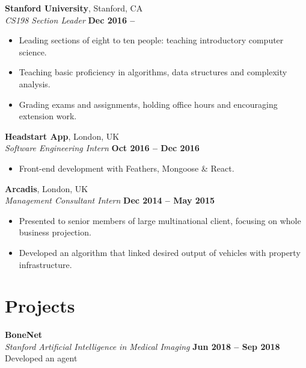 \documentclass[margin,line]{resume}
\begin{document}
\begin{resume}
    \textbf{Stanford University}, Stanford, CA \vspace{2mm}\\\vspace{1mm}%
    \textsl{CS198 Section Leader} \hfill \textbf{Dec 2016 --}
    \begin{itemize}
 	\item Leading sections of eight to ten people: teaching introductory computer science.
    \item Teaching basic proficiency in algorithms, data structures and complexity analysis.
	\item Grading exams and assignments, holding office hours and encouraging extension work.
    \end{itemize}

    \textbf{Headstart App}, London, UK \vspace{2mm}\\\vspace{1mm}%
    \textsl{Software Engineering Intern} \hfill \textbf{Oct 2016 -- Dec 2016}
    \begin{itemize}
    \item Front-end development with Feathers, Mongoose \& React.
    \end{itemize}

    \textbf{Arcadis}, London, UK \vspace{2mm}\\\vspace{1mm}%
    \textsl{Management Consultant Intern} \hfill \textbf{Dec 2014 -- May 2015}
    \begin{itemize}
        \item Presented to senior members of large multinational client, focusing on whole business projection.
        \item Developed an algorithm that linked desired output of vehicles with property infrastructure.
    \end{itemize}

   \section{\mysidestyle Projects}
   
   \textbf{BoneNet} \vspace{2mm}\\\vspace{1mm}%
   	\textsl{Stanford Artificial Intelligence in Medical Imaging} \hfill \textbf{Jun 2018 -- Sep 2018}
    Developed an agent


\end{resume}
\end{document}
